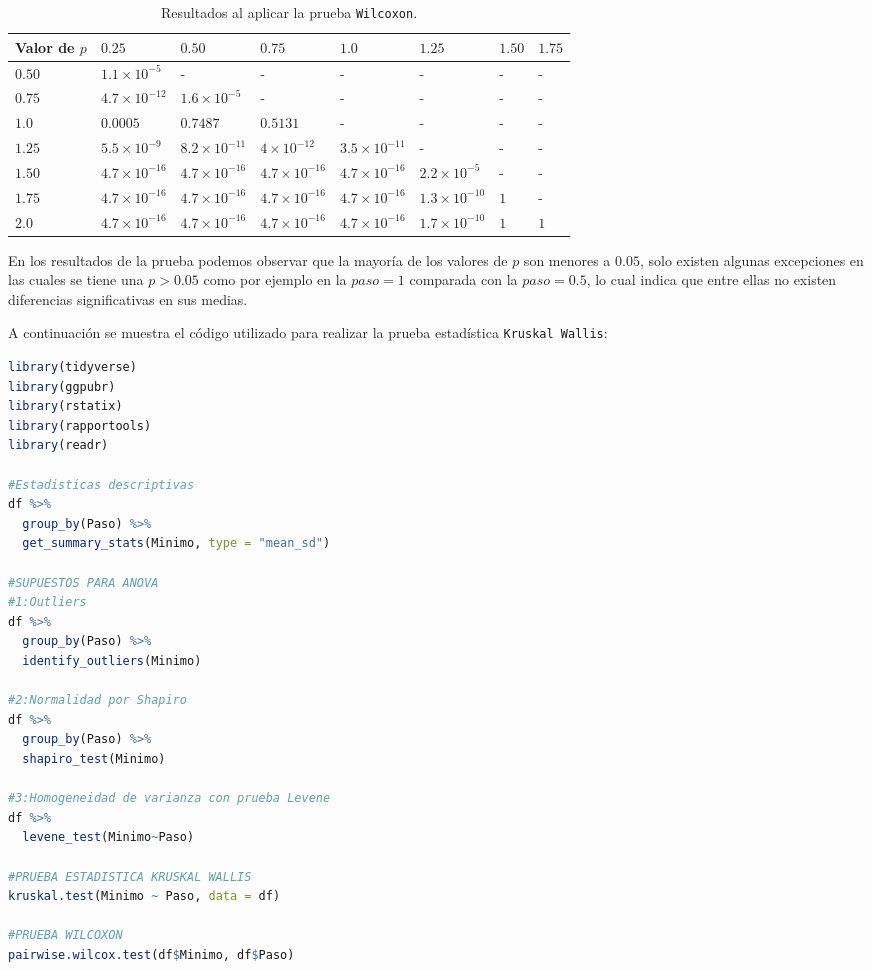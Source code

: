 \documentclass{article}
\begin{document}
\begin{table}[ht]
\centering
\caption{Resultados al aplicar la prueba \texttt{Wilcoxon}.}
\smallskip

\begin{tabular}{|p{1.7cm}|p{1.7cm}|p{1.7cm}|p{1.7cm}|p{1.7cm}|p{1.7cm}|p{1cm}|p{1cm}|}
 \hline
Valor de $p$ & $0.25$ & $0.50$ & $0.75$ & $1.0$ & $1.25$ & $1.50$ & $1.75$\\
 \hline
 $0.50$ & $1.1\times 10^{-5}$ & - & - & - & - & - & - \\
 \hline
 $0.75$ & $4.7\times 10^{-12}$ & $1.6\times 10^{-5}$ & - & - & - & - & - \\
 \hline
 $1.0$ & $0.0005$ & $0.7487$ & $0.5131$ & - & - & - & - \\
 \hline
 $1.25$ & $5.5\times 10^{-9}$ & $8.2\times 10^{-11}$ & $4\times 10^{-12}$ & $3.5\times 10^{-11}$ & - & - & - \\
 \hline
 $1.50$ & $4.7\times 10^{-16}$ & $4.7\times 10^{-16}$ & $4.7\times 10^{-16}$ & $4.7\times 10^{-16}$ & $2.2\times 10^{-5}$ & - & - \\
 \hline
 $1.75$ & $4.7\times 10^{-16}$ & $4.7\times 10^{-16}$ & $4.7\times 10^{-16}$ & $4.7\times 10^{-16}$ & $1.3\times 10^{-10}$ & $1$ & - \\
 \hline
 $2.0$ & $4.7\times 10^{-16}$ & $4.7\times 10^{-16}$ & $4.7\times 10^{-16}$ & $4.7\times 10^{-16}$ & $1.7\times 10^{-10}$ & $1$ & $1$ \\
 \hline
\end{tabular}
\label{Cuadro3}
\end{table}

En los resultados de la prueba podemos observar que la mayoría de los valores de $p$ son menores a $0.05$, solo existen algunas excepciones en las cuales se tiene una $p > 0.05$ como por ejemplo en la $paso = 1$ comparada con la $paso = 0.5$, lo cual indica que entre ellas no existen diferencias significativas en sus medias.
\bigskip

A continuación se muestra el código utilizado para realizar la prueba estadística \texttt{Kruskal Wallis}:

\lstset{style=mystyle}
\begin{lstlisting}[language=R, caption= Código para las pruebas estadísticas \texttt{Kruskal Wallis} y \texttt{Wilcoxon}.]
library(tidyverse)
library(ggpubr)
library(rstatix)
library(rapportools)
library(readr)

#Estadisticas descriptivas
df %>%
  group_by(Paso) %>%
  get_summary_stats(Minimo, type = "mean_sd")

#SUPUESTOS PARA ANOVA
#1:Outliers
df %>%
  group_by(Paso) %>%
  identify_outliers(Minimo)

#2:Normalidad por Shapiro
df %>%
  group_by(Paso) %>%
  shapiro_test(Minimo)

#3:Homogeneidad de varianza con prueba Levene
df %>%
  levene_test(Minimo~Paso)

#PRUEBA ESTADISTICA KRUSKAL WALLIS
kruskal.test(Minimo ~ Paso, data = df)

#PRUEBA WILCOXON
pairwise.wilcox.test(df$Minimo, df$Paso)
\end{lstlisting}
\end{document}
